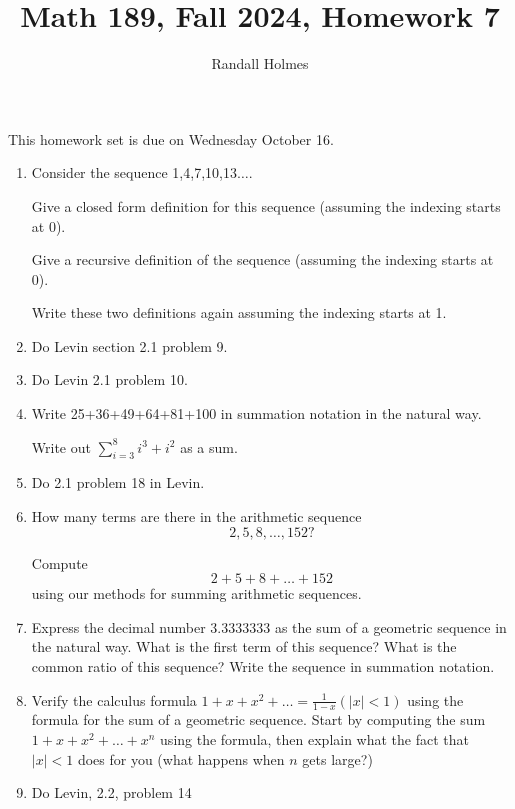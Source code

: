\documentclass[12pt]{article}
\title{Math 189, Fall 2024, Homework 7}
\author{Randall Holmes}
\begin{document}
\maketitle

This homework set is due on Wednesday October 16.

\begin{enumerate}

\item   Consider the sequence 1,4,7,10,13$\ldots$.

Give a closed form definition for this sequence (assuming the indexing starts at 0).

Give a recursive definition of the sequence (assuming the indexing starts at 0).

Write these two definitions again assuming the indexing starts at 1.

\item   Do Levin section 2.1 problem 9. 

\item   Do Levin 2.1 problem 10.

\item  Write 25+36+49+64+81+100 in summation notation in the natural way.

Write out $\sum_{i=3}^8 i^3+i^2$ as a sum.

\item  Do 2.1 problem 18 in Levin.


\item  How many terms are there in the arithmetic sequence $$2,5,8,\ldots,152?$$

Compute  $$2+5+8+\ldots+152$$ using our methods for summing arithmetic sequences.


\item  Express the decimal number 3.3333333 as the sum of a geometric sequence in the natural way.  What is the first term of this sequence?  What is the common ratio of this sequence?  Write the sequence in summation notation.


\item  Verify the calculus formula $1+x+x^2+\ldots = \frac{1}{1-x} (|x|<1)$ using the formula for the sum of a geometric sequence.  Start by computing the sum
$1+x+x^2+\ldots+x^n$ using the formula, then explain what the fact that $|x|<1$ does for you (what happens when $n$ gets large?)


\item  Do Levin, 2.2, problem 14


\end{enumerate}
\end{document}
